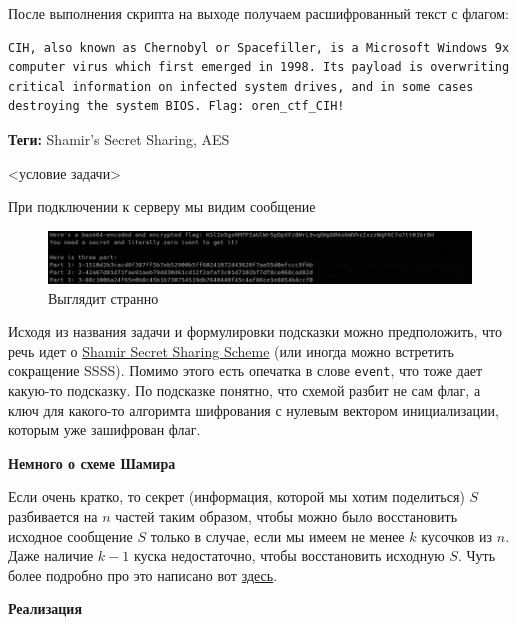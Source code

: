 \documentclass[idxtotoc,hyperref,openany,oneside]{files/crypto} %
\begin{document}
После выполнения скрипта на выходе получаем расшифрованный текст с флагом:
\begin{verbatim}
CIH, also known as Chernobyl or Spacefiller, is a Microsoft Windows 9x
computer virus which first emerged in 1998. Its payload is overwriting
critical information on infected system drives, and in some cases
destroying the system BIOS. Flag: oren_ctf_CIH!
\end{verbatim}



\textbf{Теги:} Shamir's Secret Sharing, AES\vspace{\baselineskip}

\begin{tcolorbox}
<условие задачи>
\end{tcolorbox}

При подключении к серверу мы видим сообщение
\begin{figure}[H]
\begin{center}
\includegraphics[width=1.0\linewidth]{files/shamir_aes}
\end{center}
\caption{Выглядит странно}
\label{fig:chinese}
\end{figure}
Исходя из названия задачи и формулировки подсказки можно предположить, что речь идет о \href{https://en.wikipedia.org/wiki/Shamir\%27s_Secret_Sharing}{Shamir Secret Sharing Scheme} (или иногда можно встретить сокращение SSSS). Помимо этого есть опечатка в слове \verb|event|, что тоже дает какую-то подсказку. По подсказке понятно, что схемой разбит не сам флаг, а ключ для какого-то алгоримта шифрования с нулевым вектором инициализации, которым уже зашифрован флаг.

\textbf{Немного о схеме Шамира}

Если очень кратко, то секрет (информация, которой мы хотим поделиться) $S$ разбивается на $n$ частей таким образом, чтобы можно было восстановить исходное сообщение $S$ только в случае, если мы имеем не менее $k$ кусочков из $n$. Даже наличие $k-1$ куска недостаточно, чтобы восстановить исходную $S$. Чуть более подробно про это написано вот \href{https://habr.com/ru/post/431392/}{здесь}.

\textbf{Реализация}
\end{document}
